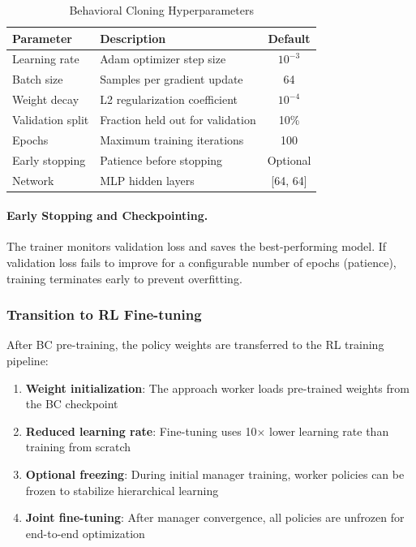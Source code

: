 \documentclass[11pt]{article}
\begin{document}
\begin{table}[H]
\centering
\caption{Behavioral Cloning Hyperparameters}
\begin{tabular}{@{}llc@{}}
\toprule
\textbf{Parameter} & \textbf{Description} & \textbf{Default} \\
\midrule
Learning rate & Adam optimizer step size & $10^{-3}$ \\
Batch size & Samples per gradient update & 64 \\
Weight decay & L2 regularization coefficient & $10^{-4}$ \\
Validation split & Fraction held out for validation & 10\% \\
Epochs & Maximum training iterations & 100 \\
Early stopping & Patience before stopping & Optional \\
Network & MLP hidden layers & [64, 64] \\
\bottomrule
\end{tabular}
\end{table}

\paragraph{Early Stopping and Checkpointing.}
The trainer monitors validation loss and saves the best-performing model. If validation loss fails to improve for a configurable number of epochs (patience), training terminates early to prevent overfitting.

\subsubsection{Transition to RL Fine-tuning}

After BC pre-training, the policy weights are transferred to the RL training pipeline:

\begin{enumerate}
    \item \textbf{Weight initialization}: The approach worker loads pre-trained weights from the BC checkpoint
    \item \textbf{Reduced learning rate}: Fine-tuning uses 10$\times$ lower learning rate than training from scratch
    \item \textbf{Optional freezing}: During initial manager training, worker policies can be frozen to stabilize hierarchical learning
    \item \textbf{Joint fine-tuning}: After manager convergence, all policies are unfrozen for end-to-end optimization
\end{enumerate}
\end{document}
